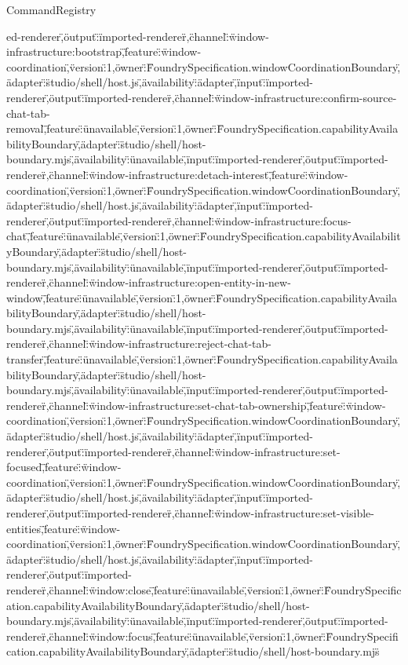 \begin{lexlean}{CommandRegistry}
\begin{semanticmodule}
{ed-renderer\",\"output\":\"imported-renderer\"},{\"channel\":\"window-infrastructure:bootstrap\",\"feature\":\"window-coordination\",\"version\":1,\"owner\":\"FoundrySpecification.windowCoordinationBoundary\",\"adapter\":\"studio/shell/host.js\",\"availability\":\"adapter\",\"input\":\"imported-renderer\",\"output\":\"imported-renderer\"},{\"channel\":\"window-infrastructure:confirm-source-chat-tab-removal\",\"feature\":\"unavailable\",\"version\":1,\"owner\":\"FoundrySpecification.capabilityAvailabilityBoundary\",\"adapter\":\"studio/shell/host-boundary.mjs\",\"availability\":\"unavailable\",\"input\":\"imported-renderer\",\"output\":\"imported-renderer\"},{\"channel\":\"window-infrastructure:detach-interest\",\"feature\":\"window-coordination\",\"version\":1,\"owner\":\"FoundrySpecification.windowCoordinationBoundary\",\"adapter\":\"studio/shell/host.js\",\"availability\":\"adapter\",\"input\":\"imported-renderer\",\"output\":\"imported-renderer\"},{\"channel\":\"window-infrastructure:focus-chat\",\"feature\":\"unavailable\",\"version\":1,\"owner\":\"FoundrySpecification.capabilityAvailabilityBoundary\",\"adapter\":\"studio/shell/host-boundary.mjs\",\"availability\":\"unavailable\",\"input\":\"imported-renderer\",\"output\":\"imported-renderer\"},{\"channel\":\"window-infrastructure:open-entity-in-new-window\",\"feature\":\"unavailable\",\"version\":1,\"owner\":\"FoundrySpecification.capabilityAvailabilityBoundary\",\"adapter\":\"studio/shell/host-boundary.mjs\",\"availability\":\"unavailable\",\"input\":\"imported-renderer\",\"output\":\"imported-renderer\"},{\"channel\":\"window-infrastructure:reject-chat-tab-transfer\",\"feature\":\"unavailable\",\"version\":1,\"owner\":\"FoundrySpecification.capabilityAvailabilityBoundary\",\"adapter\":\"studio/shell/host-boundary.mjs\",\"availability\":\"unavailable\",\"input\":\"imported-renderer\",\"output\":\"imported-renderer\"},{\"channel\":\"window-infrastructure:set-chat-tab-ownership\",\"feature\":\"window-coordination\",\"version\":1,\"owner\":\"FoundrySpecification.windowCoordinationBoundary\",\"adapter\":\"studio/shell/host.js\",\"availability\":\"adapter\",\"input\":\"imported-renderer\",\"output\":\"imported-renderer\"},{\"channel\":\"window-infrastructure:set-focused\",\"feature\":\"window-coordination\",\"version\":1,\"owner\":\"FoundrySpecification.windowCoordinationBoundary\",\"adapter\":\"studio/shell/host.js\",\"availability\":\"adapter\",\"input\":\"imported-renderer\",\"output\":\"imported-renderer\"},{\"channel\":\"window-infrastructure:set-visible-entities\",\"feature\":\"window-coordination\",\"version\":1,\"owner\":\"FoundrySpecification.windowCoordinationBoundary\",\"adapter\":\"studio/shell/host.js\",\"availability\":\"adapter\",\"input\":\"imported-renderer\",\"output\":\"imported-renderer\"},{\"channel\":\"window:close\",\"feature\":\"unavailable\",\"version\":1,\"owner\":\"FoundrySpecification.capabilityAvailabilityBoundary\",\"adapter\":\"studio/shell/host-boundary.mjs\",\"availability\":\"unavailable\",\"input\":\"imported-renderer\",\"output\":\"imported-renderer\"},{\"channel\":\"window:focus\",\"feature\":\"unavailable\",\"version\":1,\"owner\":\"FoundrySpecification.capabilityAvailabilityBoundary\",\"adapter\":\"studio/shell/host-boundary.mjs\"}
\end{semanticmodule}
\end{lexlean}
